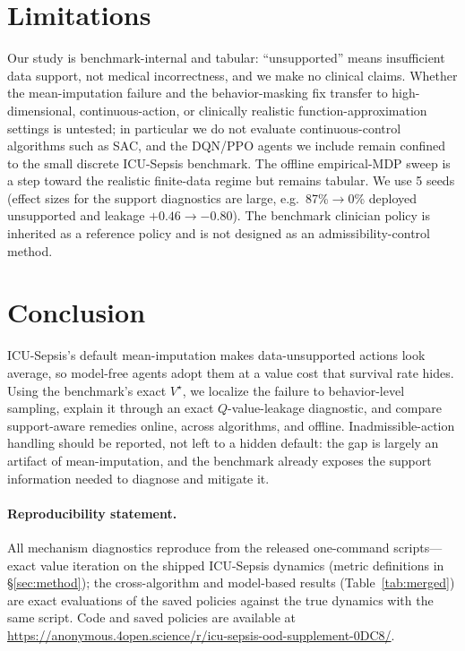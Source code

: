 \documentclass{article}
\begin{document}
\section{Limitations}
\label{sec:limitations}
Our study is benchmark-internal and tabular: ``unsupported'' means insufficient data
support, not medical incorrectness, and we make no clinical claims. Whether the
mean-imputation failure and the behavior-masking fix transfer to high-dimensional,
continuous-action, or clinically realistic function-approximation settings is
untested; in particular we do not evaluate continuous-control algorithms such as
SAC, and the DQN/PPO agents we include remain confined to the small discrete
ICU-Sepsis benchmark. The offline empirical-MDP sweep is a step toward the
realistic finite-data regime but remains tabular. We use 5 seeds (effect
sizes for the support diagnostics are large, e.g.\ 87\%$\to$0\% deployed unsupported
and leakage $+0.46\to-0.80$). The benchmark clinician policy is inherited as a
reference policy and is not designed as an admissibility-control method.

\section{Conclusion}
\label{sec:conclusion}
ICU-Sepsis's default mean-imputation makes data-unsupported actions look average, so
model-free agents adopt them at a value cost that survival rate hides. Using the
benchmark's exact $V^\star$, we localize the failure to behavior-level sampling,
explain it through an exact $Q$-value-leakage diagnostic, and compare support-aware
remedies online, across algorithms, and offline. Inadmissible-action handling should
be reported, not left to a hidden default: the gap is largely an artifact of
mean-imputation, and the benchmark already exposes the support information needed to
diagnose and mitigate it.

\paragraph{Reproducibility statement.}
All mechanism diagnostics reproduce from the released one-command scripts---exact value
iteration on the shipped ICU-Sepsis dynamics (metric definitions in \S\ref{sec:method});
the cross-algorithm and model-based results (Table~\ref{tab:merged}) are exact
evaluations of the saved policies against the true dynamics with the same script.
Code and saved policies are available at
\url{https://anonymous.4open.science/r/icu-sepsis-ood-supplement-0DC8/}.
\end{document}
